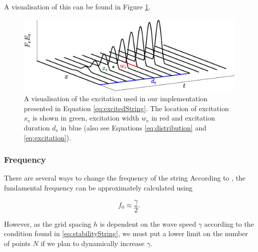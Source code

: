 \documentclass{article}
\begin{document}
A visualisation of this can be found in Figure \ref{fig:exctiation}.

\begin{figure}[t]
\centering
\includegraphics[width=1.0\columnwidth]{excitation.eps}
\caption{A visualisation of the excitation used in our implementation presented in Equation \eqref{eq:excitedString}. The location of excitation $x_\text{e}$ is shown in green, excitation width $w_\text{e}$ in red and excitation duration $d_\text{e}$ in blue (also see Equations \eqref{eq:distribution} and \eqref{eq:excitation}). \label{fig:exctiation}}
\end{figure}

\subsubsection{Frequency}
There are several ways to change the frequency of the string
According to \cite{Bilbao2009:NumericalSoundSynthesis},  the fundamental frequency can be approximately calculated using

\begin{equation}
    f_0 \approx \frac{\gamma}{2}.
\end{equation}

However, as the grid spacing $h$ is dependent on the wave speed $\gamma$ according to the condition found in \eqref{eq:stabilityString}, we must put a lower limit on the number of points $N$ if we plan to dynamically increase $\gamma$.
\end{document}
